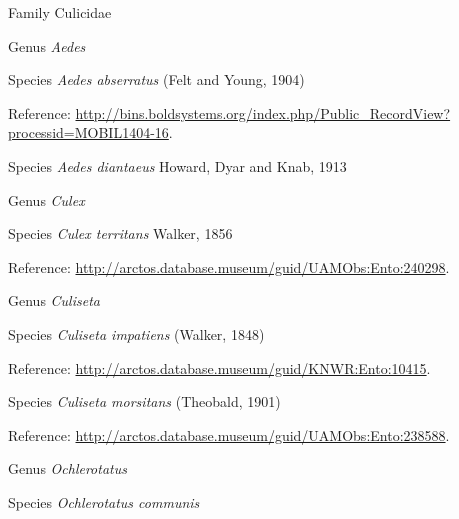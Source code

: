 \documentclass[9pt, article]{memoir}
\begin{document}
\begin{multicols}{2}
\vspace{6pt}\noindent\hspace{24pt}Family Culicidae


\vspace{6pt}\noindent\hspace{30pt}Genus \textit{Aedes}


\vspace{6pt}\noindent\hspace{36pt}Species \textit{Aedes abserratus} (Felt and Young, 1904)


Reference: 
\url{http://bins.boldsystems.org/index.php/Public_RecordView?processid=MOBIL1404-16}.

\vspace{6pt}\noindent\hspace{36pt}Species \textit{Aedes diantaeus} Howard, Dyar and Knab, 1913


\vspace{6pt}\noindent\hspace{30pt}Genus \textit{Culex}


\vspace{6pt}\noindent\hspace{36pt}Species \textit{Culex territans} Walker, 1856


Reference: 
\url{http://arctos.database.museum/guid/UAMObs:Ento:240298}.

\vspace{6pt}\noindent\hspace{30pt}Genus \textit{Culiseta}


\vspace{6pt}\noindent\hspace{36pt}Species \textit{Culiseta impatiens} (Walker, 1848)


Reference: 
\url{http://arctos.database.museum/guid/KNWR:Ento:10415}.

\vspace{6pt}\noindent\hspace{36pt}Species \textit{Culiseta morsitans} (Theobald, 1901)


Reference: 
\url{http://arctos.database.museum/guid/UAMObs:Ento:238588}.

\vspace{6pt}\noindent\hspace{30pt}Genus \textit{Ochlerotatus}


\vspace{6pt}\noindent\hspace{36pt}Species \textit{Ochlerotatus communis}



\end{multicols}
\end{document}
